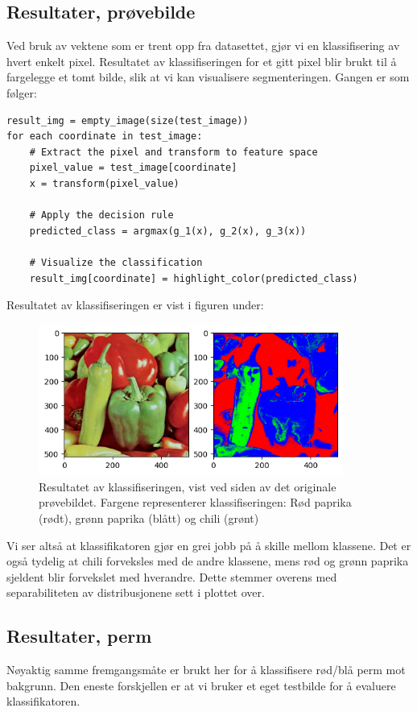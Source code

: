 \documentclass{article}
\begin{document}
\subsection*{Resultater, prøvebilde}
Ved bruk av vektene som er trent opp fra datasettet, gjør vi en klassifisering av hvert enkelt pixel.
Resultatet av klassifiseringen for et gitt pixel blir brukt til å fargelegge et tomt bilde, slik at vi kan visualisere
segmenteringen. Gangen er som følger:
\begin{verbatim}
result_img = empty_image(size(test_image))
for each coordinate in test_image:
    # Extract the pixel and transform to feature space
    pixel_value = test_image[coordinate]
    x = transform(pixel_value)   

    # Apply the decision rule
    predicted_class = argmax(g_1(x), g_2(x), g_3(x))
    
    # Visualize the classification
    result_img[coordinate] = highlight_color(predicted_class)

\end{verbatim}
Resultatet av klassifiseringen er vist i figuren under:
\newpage
\begin{figure}[h]
    \centering
    \includegraphics[width=10cm]{resultat_paprika}
    \caption{Resultatet av klassifiseringen, vist ved siden av det originale prøvebildet. Fargene representerer klassifiseringen: Rød paprika (rødt), grønn paprika (blått) og chili (grønt)}
\end{figure}
Vi ser altså at klassifikatoren gjør en grei jobb på å skille mellom klassene.
Det er også tydelig at chili forveksles med de andre klassene, mens rød og grønn paprika sjeldent blir forvekslet med hverandre.
Dette stemmer overens med separabiliteten av distribusjonene sett i plottet over.

\subsection*{Resultater, perm}
Nøyaktig samme fremgangsmåte er brukt her for å klassifisere rød/blå perm mot bakgrunn.
Den eneste forskjellen er at vi bruker et eget testbilde for å evaluere klassifikatoren.
\end{document}
